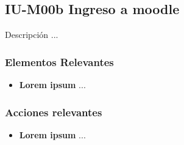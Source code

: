 
\subsection{IU-M00b Ingreso a moodle}

 Descripción ...


\subsubsection{Elementos Relevantes}

    \begin{itemize}
    \item {\bf Lorem ipsum}
        ...
    \end{itemize}

\subsubsection{Acciones relevantes}

    \begin{itemize}
    \item {\bf Lorem ipsum}
        ...
    \end{itemize}

\clearpage
